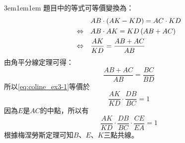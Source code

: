 \documentclass[12pt]{article}
\begin{document}
\begin{mybox}[解]{3em}{1em}{1em}
    題目中的等式可等價變換為：
    \begin{align}
        &AB\cdot\left(AK-KD\right)=AC\cdot KD\notag\\
        \Leftrightarrow\quad&AB\cdot AK=KD\left(AB+AC\right)\notag\\
        \Leftrightarrow\quad&\frac{AK}{KD}=\frac{AB+AC}{AB}\label{eq:coline_ex3-1}
    \end{align}
    由角平分線定理可得：
    $$
        \frac{AB+AC}{AB}=\frac{BC}{BD}
    $$
    所以\eqref{eq:coline_ex3-1}等價於
    $$
        \frac{AK}{KD}\cdot\frac{DB}{BC}=1\label{eq:coline_ex3-13}
    $$
    因為$E$是$AC$的中點，所以有
    $$
        \frac{AK}{KD}\cdot\frac{DB}{BC}\cdot\frac{CE}{EA}=1
    $$
    根據梅涅勞斯定理可知$B$、$E$、$K$三點共線。
\end{mybox}

\newpage
\end{document}
